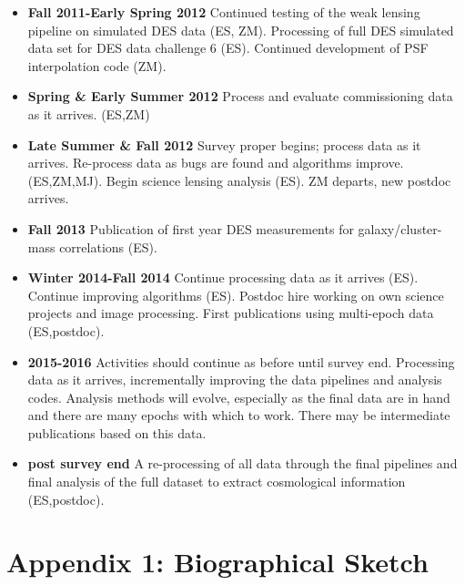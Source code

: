 \documentclass[12pt]{article}
\begin{document}
\begin{itemize}

\item {\bf Fall 2011-Early Spring 2012} Continued testing of the weak lensing
pipeline on simulated DES data (ES, ZM).  Processing of full DES
simulated data set for DES data challenge 6 (ES).     Continued development of
PSF interpolation code (ZM).

\item {\bf Spring \& Early Summer 2012} Process and evaluate commissioning data as
it arrives.  (ES,ZM)

\item {\bf Late Summer \& Fall 2012} Survey proper begins; process data as it
arrives.  Re-process data as bugs are found and algorithms improve. (ES,ZM,MJ).
Begin science lensing analysis (ES).  ZM departs, new postdoc arrives.

\item {\bf Fall 2013} Publication of first year DES measurements for
galaxy/cluster-mass correlations (ES).  

\item {\bf Winter 2014-Fall 2014} Continue processing data as it arrives (ES).
Continue improving algorithms (ES).  Postdoc hire working on own science projects
and image processing.  First publications using multi-epoch data (ES,postdoc).

\item {\bf 2015-2016}  Activities should continue as before until survey
end.  Processing data as it arrives, incrementally improving the data pipelines
and analysis codes.  Analysis methods will evolve, especially as the final data
are in hand and there are many epochs with which to work.   There may be
intermediate publications based on this data.

\item {\bf post survey end} A re-processing of all data through the final pipelines
and final analysis of the full dataset to extract cosmological information (ES,postdoc).


\end{itemize}







\newpage
{}
\section*{Appendix 1: Biographical Sketch}
\end{document}
